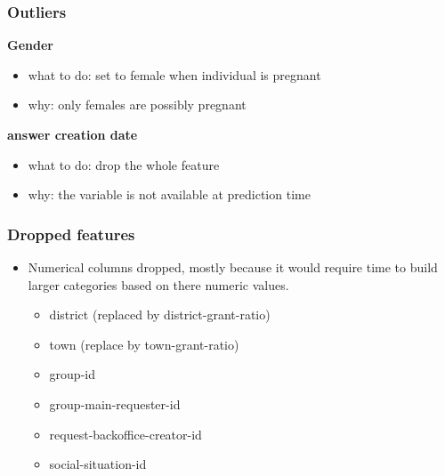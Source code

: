 \documentclass[11pt]{article}
\theoremstyle{definition}
\begin{document}
        \subsubsection{Outliers}

            \textbf{Gender}
            \begin{itemize}
                \item what to do: set to female when individual is pregnant
                \item why: only females are possibly pregnant
            \end{itemize}
        
            \textbf{answer creation date}
            \begin{itemize}
                \item what to do: drop the whole feature
                \item why: the variable is not available at prediction time
            \end{itemize}

            
        \subsubsection{Dropped features}
            
            \begin{itemize}
                \item Numerical columns dropped, mostly because it would require time to build larger categories based on there numeric values.
                \begin{itemize}
                    \item district (replaced by district-grant-ratio)
                    \item town (replace by town-grant-ratio)
                    \item group-id 
                    \item group-main-requester-id
                    \item request-backoffice-creator-id
                    \item social-situation-id
                \end{itemize}
            \end{itemize}
\end{document}
